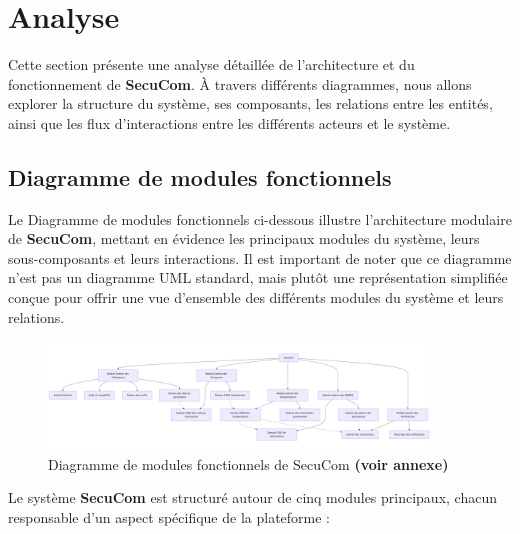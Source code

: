 \chapter{Analyse}

\noindent Cette section présente une analyse détaillée de l'architecture et du fonctionnement de \textbf{SecuCom}. À travers différents diagrammes, nous allons explorer la structure du système, ses composants, les relations entre les entités, ainsi que les flux d'interactions entre les différents acteurs et le système.

\section{Diagramme de modules fonctionnels}

\noindent Le Diagramme de modules fonctionnels ci-dessous illustre l'architecture modulaire de \textbf{SecuCom}, mettant en évidence les principaux modules du système, leurs sous-composants et leurs interactions. Il est important de noter que ce diagramme n'est pas un diagramme UML standard, mais plutôt une représentation simplifiée conçue pour offrir une vue d'ensemble des différents modules du système et leurs relations.

\begin{figure}[H]
\centering
\includegraphics[width=0.9\textwidth]{ComposantsDiagram.png}
\caption{Diagramme de modules fonctionnels de SecuCom \textbf{(voir annexe)}}
\end{figure}

\vspace{0.5cm}

\noindent Le système \textbf{SecuCom} est structuré autour de cinq modules principaux, chacun responsable d'un aspect spécifique de la plateforme :

